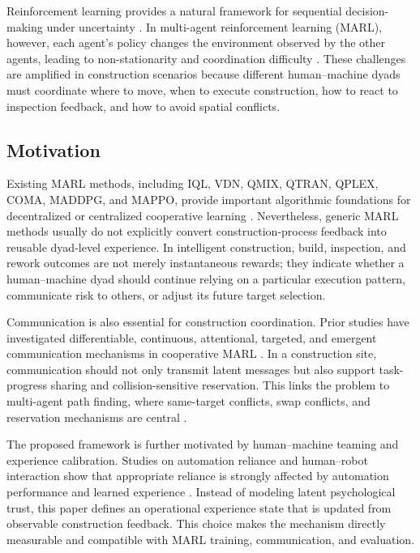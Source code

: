 \documentclass[preprint,12pt]{elsarticle}
\begin{document}
Reinforcement learning provides a natural framework for sequential decision-making under uncertainty \cite{SuttonBarto2018RL,Mnih2015DQN,Schulman2017PPO}. In multi-agent reinforcement learning (MARL), however, each agent's policy changes the environment observed by the other agents, leading to non-stationarity and coordination difficulty \cite{Tan1993MARL,Lowe2017MADDPG,Foerster2017StabilisingReplay}. These challenges are amplified in construction scenarios because different human--machine dyads must coordinate where to move, when to execute construction, how to react to inspection feedback, and how to avoid spatial conflicts.

\subsection{Motivation}

Existing MARL methods, including IQL, VDN, QMIX, QTRAN, QPLEX, COMA, MADDPG, and MAPPO, provide important algorithmic foundations for decentralized or centralized cooperative learning \cite{Tan1993MARL,Sunehag2018VDN,Rashid2018QMIX,Son2019QTRAN,Wang2021QPLEX,Foerster2018COMA,Lowe2017MADDPG,Yu2022MAPPO}. Nevertheless, generic MARL methods usually do not explicitly convert construction-process feedback into reusable dyad-level experience. In intelligent construction, build, inspection, and rework outcomes are not merely instantaneous rewards; they indicate whether a human--machine dyad should continue relying on a particular execution pattern, communicate risk to others, or adjust its future target selection.

Communication is also essential for construction coordination. Prior studies have investigated differentiable, continuous, attentional, targeted, and emergent communication mechanisms in cooperative MARL \cite{Sukhbaatar2016CommNet,Foerster2016DIAL,Jiang2018ATOC,Das2019TarMAC,Peng2017BiCNet,Mordatch2018EmergentLanguage}. In a construction site, communication should not only transmit latent messages but also support task-progress sharing and collision-sensitive reservation. This links the problem to multi-agent path finding, where same-target conflicts, swap conflicts, and reservation mechanisms are central \cite{Sharon2015CBS,Stern2019MAPF,MaKoenig2016TAPF,Cap2015DecentralizedPlanning,Li2021LifelongMAPF}.

The proposed framework is further motivated by human--machine teaming and experience calibration. Studies on automation reliance and human--robot interaction show that appropriate reliance is strongly affected by automation performance and learned experience \cite{LeeSee2004Trust,HoffBashir2015Trust,Hancock2011TrustHRI,ChenBarnes2014HumanAgentTeaming,GoodrichSchultz2007HRI,Parasuraman2000LevelsAutomation}. Instead of modeling latent psychological trust, this paper defines an operational experience state that is updated from observable construction feedback. This choice makes the mechanism directly measurable and compatible with MARL training, communication, and evaluation.
\end{document}
